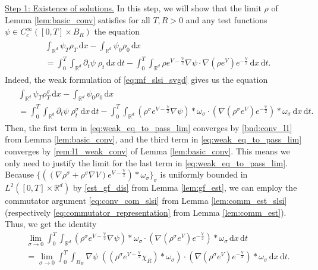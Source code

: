 \documentclass[reqno, 11pt]{amsart}
\numberwithin{equation}{section}
\theoremstyle{definition}
\begin{document}
\underline{Step 1: Existence of solutions.}
In this step, we will show that the limit $\rho$ of Lemma \ref{lem:basic_conv} satisfies for all $T,R>0$ and any test functions $\psi\in C_c^\infty([0,T]\times B_R)$ the equation
\begin{align}
    \label{eq:weak_eq_to_pass_lim_target}
    \begin{split}
        &\int_{\mathbb{R}^{d}} \psi_T \rho_T\,\mathrm{d} x-\int_{\mathbb{R}^{d}} \psi_0 \rho_0\,\mathrm{d} x\\
        &=
        \int_0^T \int_{\mathbb{R}^{d}} \partial_t\psi\; \rho_t\,\mathrm{d} x\,\mathrm{d} t
        -\int_0^T\int_{\mathbb{R}^{d}} \rho e^{V-\frac{\mathbb{V}}{2}}\nabla \psi\cdot \nabla (\rho e^V) e^{-\frac{\mathbb{V}}{2}}\,\mathrm{d} x\,\mathrm{d} t.
    \end{split}
\end{align}
Indeed, the weak formulation of \eqref{eq:mf_slsi_svgd} gives us the equation
\begin{align}
    \label{eq:weak_eq_to_pass_lim}
    \begin{split}
        &\int_{\mathbb{R}^{d}} \psi_T \rho_T^\sigma\,\mathrm{d} x-\int_{\mathbb{R}^{d}} \psi_0 \rho_0\,\mathrm{d} x\\
        &=
        \int_0^T \int_{\mathbb{R}^{d}} \partial_t\psi\; \rho_t^\sigma\,\mathrm{d} x\,\mathrm{d} t
        -\int_0^T\int_{\mathbb{R}^{d}} (\rho^\sigma e^{V-\frac{\mathbb{V}}{2}}\nabla \psi)\ast \omega_\sigma\cdot (\nabla (\rho^\sigma e^V) e^{-\frac{\mathbb{V}}{2}})\ast \omega_\sigma\,\mathrm{d} x \,\mathrm{d} t.
    \end{split}
\end{align}
Then, the first term in \eqref{eq:weak_eq_to_pass_lim} converges by \ref{bnd:conv_l1} from Lemma \ref{lem:basic_conv}, and the third term in \eqref{eq:weak_eq_to_pass_lim} converges by \ref{rem:l1_weak_conv} of Lemma \ref{lem:basic_conv}. This means we only need to justify the limit for the last term in \eqref{eq:weak_eq_to_pass_lim}. Because $\{((\nabla\rho^\sigma+\rho^\sigma\nabla V)e^{V-\frac{\mathbb{V}}{2}})\ast\omega_\sigma\}_\sigma$ is uniformly bounded in $L^2([0,T]\times \mathbb{R}^{d})$ by \ref{est_gf_dis} from Lemma \ref{lem:gf_est}, we can employ the commutator argument \eqref{eq:conv_com_slsi} from Lemma \ref{lem:comm_est_slsi} (respectively \eqref{eq:commutator_representation} from Lemma \ref{lem:comm_est}). Thus, we get the identity
\begin{align*}
    &\lim_{\sigma\to 0}\int_0^T\int_{\mathbb{R}^{d}} (\rho^\sigma e^{V-\frac{\mathbb{V}}{2}}\nabla \psi)\ast \omega_\sigma\cdot (\nabla (\rho^\sigma e^V) e^{-\frac{\mathbb{V}}{2}})\ast \omega_\sigma\,\mathrm{d} x \,\mathrm{d} t\\
    &=\lim_{\sigma\rightarrow 0}\int_0^T\int_{B_R} \nabla \psi\;((\rho^\sigma e^{V-\frac{\mathbb{V}}{2}}\chi_R)\ast \omega_\sigma)\cdot (\nabla (\rho^\sigma e^V)e ^{-\frac{\mathbb{V}}{2}})\ast \omega_\sigma \,\mathrm{d} x\,\mathrm{d} t.
\end{align*}
\end{document}
